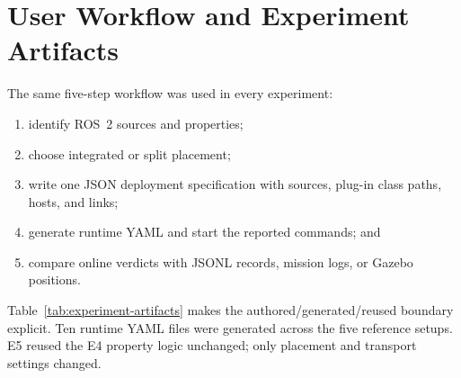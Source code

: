 \section{User Workflow and Experiment Artifacts}

The same five-step workflow was used in every experiment:

\begin{enumerate}
  \item identify ROS~2 sources and properties;
  \item choose integrated or split placement;
  \item write one JSON deployment specification with sources, plug-in class
  paths, hosts, and links;
  \item generate runtime YAML and start the reported commands; and
  \item compare online verdicts with JSONL records, mission logs, or Gazebo
  positions.
\end{enumerate}

Table~\ref{tab:experiment-artifacts} makes the authored/generated/reused boundary
explicit. Ten runtime YAML files were generated across the five reference
setups. E5 reused the E4 property logic unchanged; only placement and transport
settings changed.

